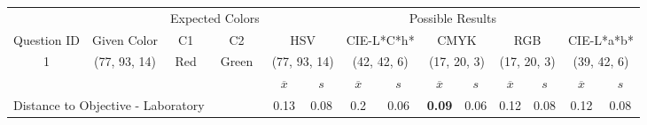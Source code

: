 %
\begin{table}[H]
  \resizebox{\textwidth}{!} {
  \begin{tabular}{lccccccccccccc}
    \hline
    \multicolumn{1}{c}{}                              &                                      & \multicolumn{2}{c}{Expected Colors}                   & \multicolumn{10}{c}{Possible Results}                                                                                                                                                                                                                                                                                        \\ \cline{3-14}
    \multicolumn{1}{c}{\multirow{-2}{*}{Question ID}} & \multirow{-2}{*}{Given Color}        & C1                       & C2                         & \multicolumn{2}{c}{HSV}                                        & \multicolumn{2}{c}{CIE-L*C*h*}                                 & \multicolumn{2}{c}{CMYK}                                       & \multicolumn{2}{c}{RGB}                                        & \multicolumn{2}{c}{CIE-L*a*b*}                                 \\ \hline
    \multicolumn{1}{c}{1}                             & \cellcolor[HTML]{FFFF00}(77, 93, 14) & \multicolumn{1}{c|}{Red} & \multicolumn{1}{c|}{Green} & \multicolumn{2}{c|}{\cellcolor[HTML]{FFFF00}(77, 93, 14)}      & \multicolumn{2}{c|}{\cellcolor[HTML]{D7A700}(42, 42, 6)}       & \multicolumn{2}{c|}{\cellcolor[HTML]{808000}(17, 20, 3)}       & \multicolumn{2}{c|}{\cellcolor[HTML]{808000}(17, 20, 3)}       & \multicolumn{2}{c|}{\cellcolor[HTML]{C9AB00}(39, 42, 6)}       \\ \hline
                                                      & \multicolumn{1}{l}{}                 & \multicolumn{1}{l}{}     & \multicolumn{1}{l}{}       & \multicolumn{1}{c}{$\overline{x}$} & \multicolumn{1}{c}{$s$} & \multicolumn{1}{c}{$\overline{x}$} & \multicolumn{1}{c}{$s$} & \multicolumn{1}{c}{$\overline{x}$} & \multicolumn{1}{c}{$s$} & \multicolumn{1}{c}{$\overline{x}$} & \multicolumn{1}{c}{$s$} & \multicolumn{1}{c}{$\overline{x}$} & \multicolumn{1}{c}{$s$} \\ \hline
    \multicolumn{4}{l}{Distance to Objective - Laboratory}                                                                                           & \multicolumn{1}{|c}{0.13}       & \multicolumn{1}{c|}{0.08}    & \multicolumn{1}{|c}{0.2}        & \multicolumn{1}{c|}{0.06}    & \multicolumn{1}{|c}{\textbf{0.09}}       & \multicolumn{1}{c|}{0.06}    & \multicolumn{1}{|c}{0.12}       & \multicolumn{1}{c|}{0.08}    & \multicolumn{1}{|c}{0.12}       & \multicolumn{1}{c|}{0.08}    \\

\end{tabular}}
\end{table}
